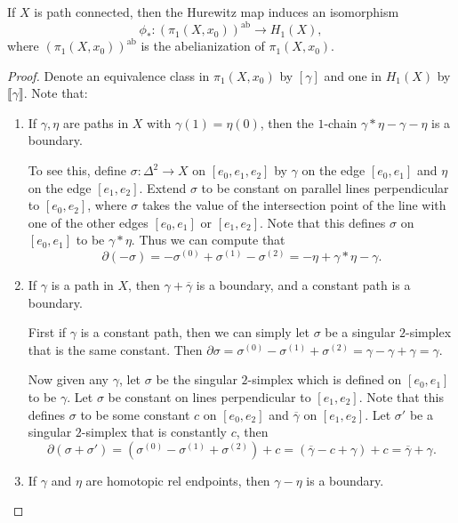 \begin{theorem}
  If $X$ is path connected, then the Hurewitz map
  induces an isomorphism
  \[
    \phi_* : (\pi_1(X, x_0))^{\mathrm{ab}} \to H_1(X),
  \]
  where $(\pi_1(X, x_0))^{\mathrm{ab}}$ is the abelianization of $\pi_1(X, x_0)$.
\end{theorem}

\begin{proof}
  Denote an equivalence class in $\pi_1(X, x_0)$
  by $[\gamma]$ and one in $H_1(X)$
  by $\llbracket \gamma \rrbracket$. Note that:
  \begin{enumerate}
    \item If $\gamma, \eta$ are paths in
      $X$ with $\gamma(1) = \eta(0)$, then
      the $1$-chain $\gamma * \eta - \gamma - \eta$
      is a boundary.

      To see this, define $\sigma : \Delta^2 \to X$
      on $[e_0, e_1, e_2]$ by
      $\gamma$ on the edge $[e_0, e_1]$ and $\eta$
      on the edge $[e_1, e_2]$. Extend $\sigma$ to
      be constant on parallel lines perpendicular
      to $[e_0, e_2]$, where $\sigma$ takes the
      value of the intersection point of the line with
      one of the other edges $[e_0, e_1]$ or $[e_1, e_2]$.
      Note that this defines $\sigma$ on $[e_0, e_1]$
      to be $\gamma * \eta$. Thus we can compute that
      \[
        \partial(-\sigma) = -\sigma^{(0)} + \sigma^{(1)} - \sigma^{(2)}
        = - \eta + \gamma * \eta - \gamma.
      \]
    \item If $\gamma$ is a path in $X$, then
      $\gamma + \overline{\gamma}$ is a boundary, and
      a constant path is a boundary.

      First if $\gamma$ is a constant path, then we
      can simply let $\sigma$ be a singular $2$-simplex
      that is the same constant. Then
      $\partial \sigma = \sigma^{(0)} - \sigma^{(1)} + \sigma^{(2)} = \gamma - \gamma + \gamma = \gamma$.

      Now given any $\gamma$, let
      $\sigma$ be the singular $2$-simplex
      which is defined on $[e_0, e_1]$ to be $\gamma$.
      Let $\sigma$ be constant on lines perpendicular
      to $[e_1, e_2]$. Note that this defines $\sigma$
      to be some constant $c$ on $[e_0, e_2]$ and
      $\overline{\gamma}$ on $[e_1, e_2]$. Let
      $\sigma'$ be a singular $2$-simplex that is
      constantly $c$, then
      \[
        \partial(\sigma + \sigma')
        = (\sigma^{(0)} - \sigma^{(1)} + \sigma^{(2)}) + c
        = (\overline{\gamma} - c + \gamma) + c
        = \overline{\gamma} + \gamma.
      \]
    \item If $\gamma$ and $\eta$ are homotopic
      rel endpoints, then $\gamma - \eta$ is a boundary.


\end{enumerate}
\end{proof}
